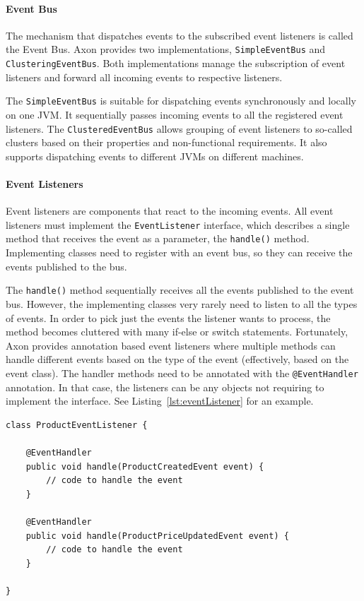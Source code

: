 \documentclass{book}
\begin{document}
\paragraph{Event Bus}\label{event-bus}

The mechanism that dispatches events to the subscribed event listeners
is called the Event Bus. Axon provides two implementations,
\texttt{SimpleEventBus} and \texttt{ClusteringEventBus}. Both
implementations manage the subscription of event listeners and forward
all incoming events to respective listeners.

The \texttt{SimpleEventBus} is suitable for dispatching events
synchronously and locally on one JVM. It sequentially passes incoming
events to all the registered event listeners. The
\texttt{ClusteredEventBus} allows grouping of event listeners to
so-called clusters based on their properties and non-functional
requirements. It also supports dispatching events to different JVMs on
different machines.

\paragraph{Event Listeners}\label{event-listeners}

Event listeners are components that react to the incoming events. All
event listeners must implement the \texttt{EventListener} interface,
which describes a single method that receives the event as a parameter,
the \texttt{handle()} method. Implementing classes need to register with
an event bus, so they can receive the events published to the bus.

The \texttt{handle()} method sequentially receives all the events
published to the event bus. However, the implementing classes very
rarely need to listen to all the types of events. In order to pick just
the events the listener wants to process, the method becomes cluttered
with many if-else or switch statements. Fortunately, Axon provides
annotation based event listeners where multiple methods can handle
different events based on the type of the event (effectively, based on
the event class). The handler methods need to be annotated with the
\texttt{@EventHandler} annotation. In that case, the listeners can be
any objects not requiring to implement the interface. See Listing~\ref{lst:eventListener} for an example.

\begin{lstlisting}[caption={An example of an annotation-based event listener in Axon},label={lst:eventListener},captionpos=b,float,floatplacement=H]
class ProductEventListener {

    @EventHandler
    public void handle(ProductCreatedEvent event) {
        // code to handle the event
    }

    @EventHandler
    public void handle(ProductPriceUpdatedEvent event) {
        // code to handle the event
    }

}
\end{lstlisting}
\end{document}
